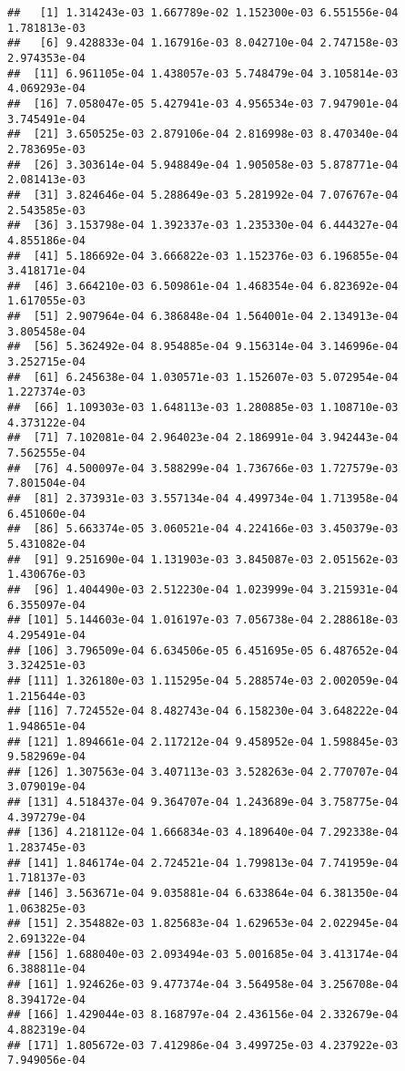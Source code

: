 \documentclass[
]{article}
\begin{document}
\begin{verbatim}
##   [1] 1.314243e-03 1.667789e-02 1.152300e-03 6.551556e-04 1.781813e-03
##   [6] 9.428833e-04 1.167916e-03 8.042710e-04 2.747158e-03 2.974353e-04
##  [11] 6.961105e-04 1.438057e-03 5.748479e-04 3.105814e-03 4.069293e-04
##  [16] 7.058047e-05 5.427941e-03 4.956534e-03 7.947901e-04 3.745491e-04
##  [21] 3.650525e-03 2.879106e-04 2.816998e-03 8.470340e-04 2.783695e-03
##  [26] 3.303614e-04 5.948849e-04 1.905058e-03 5.878771e-04 2.081413e-03
##  [31] 3.824646e-04 5.288649e-03 5.281992e-04 7.076767e-04 2.543585e-03
##  [36] 3.153798e-04 1.392337e-03 1.235330e-04 6.444327e-04 4.855186e-04
##  [41] 5.186692e-04 3.666822e-03 1.152376e-03 6.196855e-04 3.418171e-04
##  [46] 3.664210e-03 6.509861e-04 1.468354e-04 6.823692e-04 1.617055e-03
##  [51] 2.907964e-04 6.386848e-04 1.564001e-04 2.134913e-04 3.805458e-04
##  [56] 5.362492e-04 8.954885e-04 9.156314e-04 3.146996e-04 3.252715e-04
##  [61] 6.245638e-04 1.030571e-03 1.152607e-03 5.072954e-04 1.227374e-03
##  [66] 1.109303e-03 1.648113e-03 1.280885e-03 1.108710e-03 4.373122e-04
##  [71] 7.102081e-04 2.964023e-04 2.186991e-04 3.942443e-04 7.562555e-04
##  [76] 4.500097e-04 3.588299e-04 1.736766e-03 1.727579e-03 7.801504e-04
##  [81] 2.373931e-03 3.557134e-04 4.499734e-04 1.713958e-04 6.451060e-04
##  [86] 5.663374e-05 3.060521e-04 4.224166e-03 3.450379e-03 5.431082e-04
##  [91] 9.251690e-04 1.131903e-03 3.845087e-03 2.051562e-03 1.430676e-03
##  [96] 1.404490e-03 2.512230e-04 1.023999e-04 3.215931e-04 6.355097e-04
## [101] 5.144603e-04 1.016197e-03 7.056738e-04 2.288618e-03 4.295491e-04
## [106] 3.796509e-04 6.634506e-05 6.451695e-05 6.487652e-04 3.324251e-03
## [111] 1.326180e-03 1.115295e-04 5.288574e-03 2.002059e-04 1.215644e-03
## [116] 7.724552e-04 8.482743e-04 6.158230e-04 3.648222e-04 1.948651e-04
## [121] 1.894661e-04 2.117212e-04 9.458952e-04 1.598845e-03 9.582969e-04
## [126] 1.307563e-04 3.407113e-03 3.528263e-04 2.770707e-04 3.079019e-04
## [131] 4.518437e-04 9.364707e-04 1.243689e-04 3.758775e-04 4.397279e-04
## [136] 4.218112e-04 1.666834e-03 4.189640e-04 7.292338e-04 1.283745e-03
## [141] 1.846174e-04 2.724521e-04 1.799813e-04 7.741959e-04 1.718137e-03
## [146] 3.563671e-04 9.035881e-04 6.633864e-04 6.381350e-04 1.063825e-03
## [151] 2.354882e-03 1.825683e-04 1.629653e-04 2.022945e-04 2.691322e-04
## [156] 1.688040e-03 2.093494e-03 5.001685e-04 3.413174e-04 6.388811e-04
## [161] 1.924626e-03 9.477374e-04 3.564958e-04 3.256708e-04 8.394172e-04
## [166] 1.429044e-03 8.168797e-04 2.436156e-04 2.332679e-04 4.882319e-04
## [171] 1.805672e-03 7.412986e-04 3.499725e-03 4.237922e-03 7.949056e-04

\end{verbatim}
\end{document}

